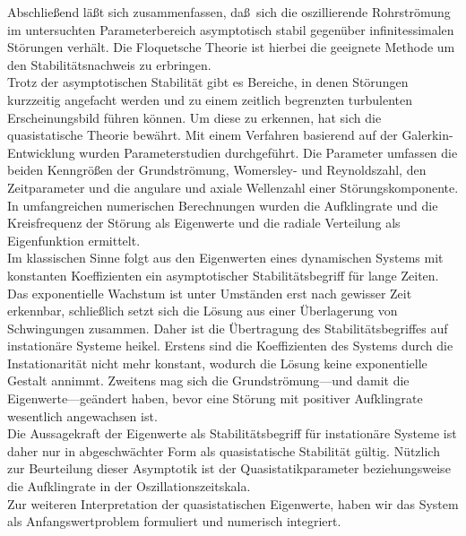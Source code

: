 \documentclass[10pt,a5paper,oneside,draft]{book}
\numberwithin{equation}{chapter}
\begin{document}
Abschlie\ss end l\"a\ss t sich zusammenfassen, da\ss\ sich die oszillierende Rohrstr\"omung im untersuchten Parameterbereich asymptotisch stabil gegen\"uber infinitessimalen St\"orungen verh\"alt.
Die Floquetsche Theorie ist hierbei die geeignete Methode um den Stabilit\"atsnachweis zu erbringen.\\
Trotz der asymptotischen Stabilit\"at gibt es Bereiche, in denen St\"orungen kurzzeitig angefacht werden und zu einem zeitlich begrenzten turbulenten Erscheinungsbild f\"uhren k\"onnen.
Um diese zu erkennen, hat sich die quasistatische Theorie bew\"ahrt.
Mit einem Verfahren basierend auf der Galerkin-Entwicklung wurden Parameterstudien durchgef\"uhrt.
Die Parameter umfassen die beiden Kenngr\"o\ss en der Grundstr\"omung, Womersley- und Reynoldszahl, den Zeitparameter und die angulare und axiale Wellenzahl einer St\"orungskomponente.
In umfangreichen numerischen Berechnungen wurden die Aufklingrate und die Kreisfrequenz der St\"orung als Eigenwerte und die radiale Verteilung als Eigenfunktion ermittelt.\\

Im klassischen Sinne folgt aus den Eigenwerten eines dynamischen Systems mit konstanten Koeffizienten ein asymptotischer Stabilit\"atsbegriff f\"ur lange Zeiten.
Das exponentielle Wachstum ist unter Umst\"anden erst nach gewisser Zeit erkennbar, schlie\ss lich setzt sich die L\"osung aus einer \"Uberlagerung von Schwingungen zusammen.
Daher ist die \"Ubertragung des Stabilit\"atsbegriffes auf instation\"are Systeme heikel.
Erstens sind die Koeffizienten des Systems durch die Instationarit\"at nicht mehr konstant, wodurch die L\"osung keine exponentielle Gestalt annimmt.
Zweitens mag sich die Grundstr\"omung---und damit die Eigenwerte---ge\"andert haben, bevor eine St\"orung mit positiver Aufklingrate wesentlich angewachsen ist.\\
Die Aussagekraft der Eigenwerte als Stabilit\"atsbegriff f\"ur instation\"are Systeme ist daher nur in abgeschw\"achter Form als quasistatische Stabilit\"at g\"ultig.
N\"utzlich zur Beurteilung dieser Asymptotik ist der Quasistatikparameter beziehungsweise die Aufklingrate in der Oszillationszeitskala.\\
Zur weiteren Interpretation der quasistatischen Eigenwerte, haben wir das System als Anfangswertproblem formuliert und numerisch integriert.\\
\end{document}

